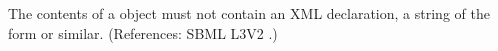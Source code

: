 The contents of a \Notes object must not contain an XML declaration, \ie
a string of the form  or
similar.  (References: SBML L3V2 .)
